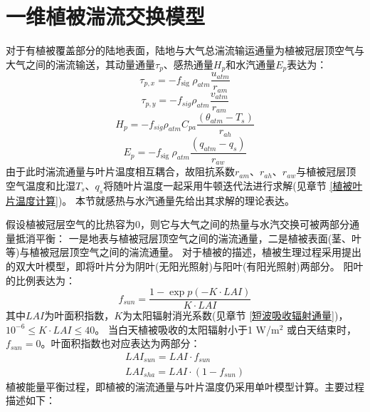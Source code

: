 \section{一维植被湍流交换模型}\label{一维植被湍流交换模型}
对于有植被覆盖部分的陆地表面，陆地与大气总湍流输运通量为植被冠层顶空气与大气之间的湍流输送，其动量通量$\tau_p$、感热通量$H_p$和水汽通量$E_p$表达为：
\begin{equation}
\tau_{p, x}=-f_{\text {sig }} \rho_{atm} \frac{u_{atm}}{r_{a m}}
\end{equation}
\begin{equation}
\tau_{p, y}=-f_{sig} \rho_{atm} \frac{v_{atm}}{r_{a m}}
\end{equation}
\begin{equation}
H_{p}=-f_{sig} \rho_{atm} C_{p a} \frac{\left(\theta_{atm}-T_{s}\right)}{r_{a h}}
\end{equation}
\begin{equation}
E_{p}=-f_{\text {sig }} \rho_{atm} \frac{\left(q_{atm}-q_{s}\right)}{r_{a w}}
\end{equation}
由于此时湍流通量与叶片温度相互耦合，故阻抗系数$r_{am}$、$r_{ah}$、$r_{aw}$与植被冠层顶空气温度和比湿$T_s$、$q_s$将随叶片温度一起采用牛顿迭代法进行求解(见章节 \ref{植被叶片温度计算})。
本节就感热与水汽通量先给出其求解的理论表达。


假设植被冠层空气的比热容为0，则它与大气之间的热量与水汽交换可被两部分通量抵消平衡：
一是地表与植被冠层顶空气之间的湍流通量，二是植被表面(茎、叶等)与植被冠层顶空气之间的湍流通量。
对于植被的描述，植被生理过程采用\citet{dai2004two}提出的双大叶模型，即将叶片分为阴叶(无阳光照射)与阳叶(有阳光照射)两部分。
阳叶的比例表达为：
\begin{equation}
f_{sun}=\frac{1-\exp p(-K \cdot LAI)}{K \cdot LAI}
\end{equation}
其中$LAI$为叶面积指数，$K$为太阳辐射消光系数(见章节 \ref{短波吸收辐射通量})，${10}^{-6}\le K \cdot LAI\le40$。
当白天植被吸收的太阳辐射小于1 W/m$^2$ 或白天结束时，$f_{sun}=0$。叶面积指数也对应表达为两部分：
\begin{equation}
\begin{array}{c}LAI_{sun}=LAI \cdot f_{sun} \\ LAI_{sha}=LAI \cdot \left(1-f_{sun}\right)\end{array}
\end{equation}
植被能量平衡过程，即植被的湍流通量与叶片温度仍采用单叶模型计算。主要过程描述如下：


